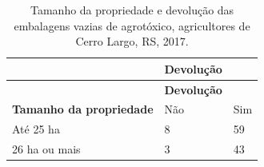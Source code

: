 \documentclass[12pt,brazil,oneside]{book}
\begin{document}
\begin{longtable}[]{@{}lll@{}}
\caption{\label{tab:tamprop1}Tamanho da propriedade e devolução das embalagens vazias de agrotóxico, agricultores de Cerro Largo, RS, 2017.}\tabularnewline
\toprule
\begin{minipage}[b]{0.37\columnwidth}\raggedright
\strut
\end{minipage} & \begin{minipage}[b]{0.34\columnwidth}\raggedright
\textbf{Devolução}\strut
\end{minipage} & \begin{minipage}[b]{0.15\columnwidth}\raggedright
\strut
\end{minipage}\tabularnewline
\midrule
\endfirsthead
\toprule
\begin{minipage}[b]{0.37\columnwidth}\raggedright
\strut
\end{minipage} & \begin{minipage}[b]{0.34\columnwidth}\raggedright
\textbf{Devolução}\strut
\end{minipage} & \begin{minipage}[b]{0.15\columnwidth}\raggedright
\strut
\end{minipage}\tabularnewline
\midrule
\endhead
\begin{minipage}[t]{0.37\columnwidth}\raggedright
\textbf{Tamanho da propriedade}\strut
\end{minipage} & \begin{minipage}[t]{0.34\columnwidth}\raggedright
Não\strut
\end{minipage} & \begin{minipage}[t]{0.15\columnwidth}\raggedright
Sim\strut
\end{minipage}\tabularnewline
\begin{minipage}[t]{0.37\columnwidth}\raggedright
Até 25 ha\strut
\end{minipage} & \begin{minipage}[t]{0.34\columnwidth}\raggedright
8\strut
\end{minipage} & \begin{minipage}[t]{0.15\columnwidth}\raggedright
59\strut
\end{minipage}\tabularnewline
\begin{minipage}[t]{0.37\columnwidth}\raggedright
26 ha ou mais\strut
\end{minipage} & \begin{minipage}[t]{0.34\columnwidth}\raggedright
3\strut
\end{minipage} & \begin{minipage}[t]{0.15\columnwidth}\raggedright
43\strut
\end{minipage}\tabularnewline
\bottomrule
\end{longtable}
\end{document}
